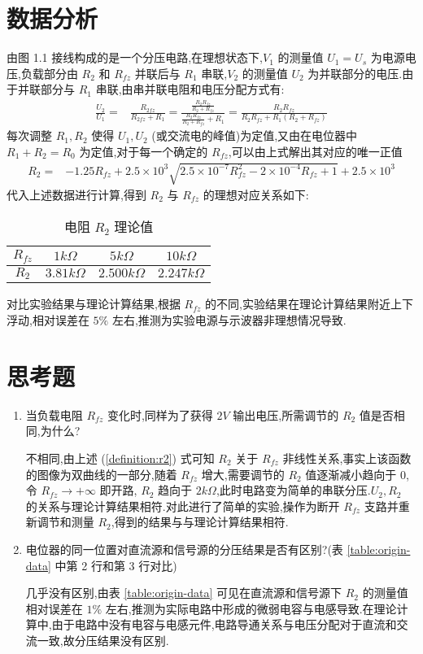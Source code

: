     \section{数据分析}
    由图 1.1 接线构成的是一个分压电路,在理想状态下,$V_1$ 的测量值 $U_1=U_s$ 为电源电压,负载部分由 $R_2$ 和 $R_{fz}$ 并联后与 $R_1$ 串联,$V_2$ 的测量值 $U_2$ 为并联部分的电压.由于并联部分与 $R_1$ 串联,由串并联电阻和电压分配方式有:
        \begin{align}
            \frac{U_2}{U_1}=&\frac{R_{2fz}}{R_{2fz}+R_1}=\frac{\frac{R_2R_{fz}}{R_2+R_{fz}}}{\frac{R_2R_{fz}}{R_2+R_{fz}}+R_1}=\frac{R_2R_{fz}}{R_2R_{fz}+R_1(R_2+R_{fz})}
        \end{align}
        每次调整 $R_1,R_2$ 使得 $U_1,U_2$ (或交流电的峰值)为定值,又由在电位器中 $R_1+R_2=R_0$ 为定值,对于每一个确定的 $R_{fz}$,可以由上式解出其对应的唯一正值
        \begin{align}
            R_2=&-1.25R_{fz}+2.5\times 10^{3}\sqrt{2.5\times 10^{-7}R_{fz}^2-2\times 10^{-4}R_{fz}+1}+2.5\times 10^{3}\label{definition:r2}
        \end{align}
        代入上述数据进行计算,得到 $R_2$ 与 $R_{fz}$ 的理想对应关系如下:
        \begin{table}[ht]
            \centering
            \begin{tabular}{c||c|c|c}
                $R_{fz}$ & $1k\Omega$ &  $5k\Omega$ & $10k\Omega$\\\hline\hline
                $R_2$ & $3.81k\Omega$ &  $2.500k\Omega$ & $2.247k\Omega$
            \end{tabular}
            \caption{电阻 $R_2$ 理论值}
        \end{table}
        
        对比实验结果与理论计算结果,根据 $R_{fz}$ 的不同,实验结果在理论计算结果附近上下浮动,相对误差在 $5\%$ 左右,推测为实验电源与示波器非理想情况导致.
    \section{思考题}
    \begin{enumerate}
        \item 当负载电阻 $R_{fz}$ 变化时,同样为了获得 $2V$ 输出电压,所需调节的 $R_2$ 值是否相同,为什么?

            不相同,由上述 (\ref{definition:r2}) 式可知 $R_2$ 关于 $R_{fz}$ 非线性关系,事实上该函数的图像为双曲线的一部分,随着 $R_{fz}$ 增大,需要调节的 $R_2$ 值逐渐减小趋向于 0,令 $R_{fz}\rightarrow +\infty$ 即开路, $R_2$ 趋向于 $2k\Omega$,此时电路变为简单的串联分压.$U_2,R_2$ 的关系与理论计算结果相符.对此进行了简单的实验,操作为断开 $R_{fz}$ 支路并重新调节和测量 $R_2$,得到的结果与与理论计算结果相符.
        \item 电位器的同一位置对直流源和信号源的分压结果是否有区别?(表 \ref{table:origin-data} 中第 2 行和第 3 行对比)

            几乎没有区别,由表 \ref{table:origin-data} 可见在直流源和信号源下 $R_2$ 的测量值相对误差在 $1\%$ 左右,推测为实际电路中形成的微弱电容与电感导致.在理论计算中,由于电路中没有电容与电感元件,电路导通关系与电压分配对于直流和交流一致,故分压结果没有区别.
    \end{enumerate}
